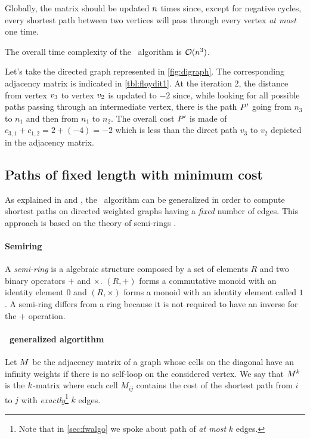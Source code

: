 Globally, the matrix should be updated $n$ times since, except for negative cycles, every shortest path between two vertices will pass through every vertex \textit{at most} one time.

The overall time complexity of the \FW\ algorithm is $\mathcal{O}(n^3)$.





Let's take the directed graph represented in \cref{fig:digraph}. The corresponding adjacency matrix is indicated in \cref{tbl:floydit1}. At the iteration 2, the distance from vertex $v_3$ to vertex $v_2$ is updated to $-2$ since, while looking for all possible paths passing through an intermediate vertex, there is the path $P'$ going from $n_3$ to $n_1$ and then from $n_1$ to $n_2$. The overall cost $P'$ is made of $c_{3,1} + c_{1,2} = 2 + (-4) = -2$ which is less than the direct path $v_3$ to $v_2$ depicted in the adjacency matrix.

\subsection{Paths of fixed length with minimum cost}

As explained in \cite{floydGeneric} and \cite{cpweb}, the \FW\ algorithm can be generalized in order to compute shortest paths on directed weighted graphs having a \textit{fixed} number of edges. This approach is based on the theory of semi-rings \cite{ullman}.

\paragraph{Semiring} A \textit{semi-ring}\cite{semiring} is a algebraic structure composed by a set of elements $R$ and two binary operators $+$ and $\times$. $(R, +)$ forms a commutative monoid with an identity element $0$ and $(R, \times)$ forms a monoid with an identity element called $1$. A semi-ring differs from a ring because it is not required to have an inverse for the $+$ operation.


\paragraph{\FW\ generalized algortithm} Let $M$ be the adjacency matrix of a graph whose cells on the diagonal have an infinity weights if there is no self-loop on the considered vertex. We say that $M^k$ is the $k$-matrix where each cell $M_{ij}$ contains the cost of the shortest path from $i$ to $j$ with \textit{exactly}\footnote{Note that in \cref{sec:fwalgo} we spoke about path of \textit{at most} $k$ edges.} $k$ edges.

